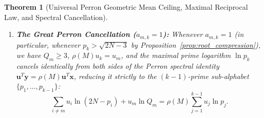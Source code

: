 \documentclass[11pt,a4paper]{article}
\newtheorem{theorem}{Theorem}[section]
\theoremstyle{definition}
\begin{document}
\begin{theorem}[Universal Perron Geometric Mean Ceiling, Maximal Reciprocal Law, and Spectral Cancellation]
\begin{enumerate}
    and the left Perron component $u_k$ satisfies the exact decoupling identity:
    \begin{equation}
    \label{eq:universal_uk_decoupling}
    \rho(M) u_k = a_{m,k} u_m \implies u_k = \frac{a_{m,k} u_m}{\rho(M)}.
    \end{equation}
    \item \textbf{The Great Perron Cancellation ($a_{m,k} = 1$):} Whenever $a_{m,k} = 1$ (in particular, whenever $p_k > \sqrt{2N-3}$ by Proposition~\ref{prop:root_compression}), we have $Q_m \ge 3$, $\rho(M) u_k = u_m$, and the maximal prime logarithm $\ln p_k$ cancels identically from both sides of the Perron spectral identity $\mathbf{u}^T \mathbf{y} = \rho(M)\mathbf{u}^T \mathbf{x}$, reducing it strictly to the $(k-1)$-prime sub-alphabet $\{p_1, \dots, p_{k-1}\}$:
    \begin{equation}
    \label{eq:universal_perron_cancellation}
    \sum_{i \ne m} u_i \ln(2N - p_i) + u_m \ln Q_m = \rho(M) \sum_{j=1}^{k-1} u_j \ln p_j.
    \end{equation}
\end{enumerate}
\end{theorem}
\end{document}
